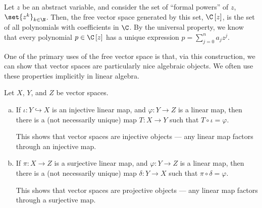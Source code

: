 \begin{example}
  Let $z$ be an abstract variable, and consider the set of ``formal powers'' of $z$, $\set{z^k}_{k\in\N}$. Then, the free vector space generated by this set, $\C\left[z\right]$, is the set of all polynomials with coefficients in $\C$. By the universal property, we know that every polynomial $p\in \C\left[z\right]$ has a unique expression $p = \sum_{j=0}^{n}a_jz^j$.
\end{example}
One of the primary uses of the free vector space is that, via this construction, we can show that vector spaces are particularly nice algebraic objects. We often use these properties implicitly in linear algebra.
\begin{theorem}\label{thm:injective_projective_objects}
  Let $X$, $Y$, and $Z$ be vector spaces.
  \begin{enumerate}[(a)]
    \item If $\iota\colon Y\hookrightarrow X$ is an injective linear map, and $\varphi\colon Y\rightarrow Z$ is a linear map, then there is a (not necessarily unique) map $T\colon X\rightarrow Y$ such that $T\circ\iota = \varphi$.
      \begin{center}
      \end{center}
This shows that vector spaces are injective objects --- any linear map factors through an injective map.
    \item If $\pi\colon X\rightarrow Z$ is a surjective linear map, and $\varphi\colon Y\rightarrow Z$ is a linear map, then there is a (not necessarily unique) map $\delta\colon Y\rightarrow X$ such that $\pi\circ\delta = \varphi$.
      \begin{center}
      \end{center}
      This shows that vector spaces are projective objects --- any linear map factors through a surjective map.
  \end{enumerate}
\end{theorem}
